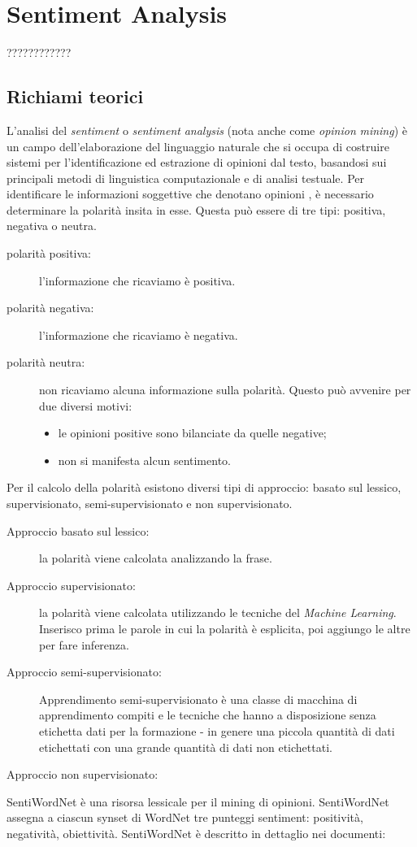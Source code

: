 \chapter{Sentiment Analysis}
	????????????
	
	\section{Richiami teorici}
		L'analisi del \textit{sentiment} o \textit{sentiment} \textit{analysis} (nota anche come \textit{opinion} \textit{mining}) è un campo dell'elaborazione del linguaggio naturale che si occupa di costruire sistemi per l'identificazione ed estrazione di opinioni dal testo, basandosi sui principali metodi di linguistica computazionale e di analisi testuale. Per identificare le informazioni soggettive che denotano opinioni , è necessario determinare la polarità insita in esse. Questa può essere di tre tipi: positiva, negativa o neutra.
		
		\begin{description}
			\item [polarità positiva:] l'informazione che ricaviamo è positiva.
			\item [polarità negativa:] l'informazione che ricaviamo è negativa.
			\item [polarità neutra:] non ricaviamo alcuna informazione sulla polarità. Questo può avvenire per due diversi motivi:
			
			\begin{itemize}
				\item le opinioni positive sono bilanciate da quelle negative;
				\item non si manifesta alcun sentimento.
			\end{itemize}
			
		\end{description}
	
		Per il calcolo della polarità esistono diversi tipi di approccio: basato sul lessico, supervisionato, semi-supervisionato e non supervisionato.
		
		\begin{description}
			\item [Approccio basato sul lessico:] la polarità viene calcolata analizzando la frase.
			\item [Approccio supervisionato:] la polarità viene calcolata utilizzando le tecniche del \textit{Machine Learning}. Inserisco prima le parole in cui la polarità è esplicita, poi aggiungo le altre per fare inferenza.
			\item [Approccio semi-supervisionato:] Apprendimento semi-supervisionato è una classe di macchina di apprendimento compiti e le tecniche che hanno a disposizione senza etichetta dati per la formazione - in genere una piccola quantità di dati etichettati con una grande quantità di dati non etichettati. 
			\item [Approccio non supervisionato:] 

			
		\end{description}
		
		
		
		SentiWordNet è una risorsa lessicale per il mining di opinioni. SentiWordNet assegna a ciascun synset di WordNet tre punteggi sentiment: positività, negatività, obiettività. SentiWordNet è descritto in dettaglio nei documenti: